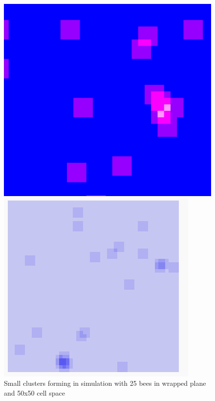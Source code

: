 \documentclass[conference,compsoc,onecolumn]{IEEEtran}
\begin{document}
\begin{figure}[!tbp]
	\centering
	\begin{minipage}[b]{0.4\textwidth}
		\includegraphics[width=\textwidth]{../images/cluster-example.png}
	\end{minipage}
	\hfill
	\begin{minipage}[b]{0.4\textwidth}
		\includegraphics[width=\textwidth]{../images/cluster-2.png}
	\end{minipage}
	\caption{Small clusters forming in simulation with 25 bees in wrapped plane and 50x50 cell space}
	\label{initialTest}
\end{figure}
\end{document}
